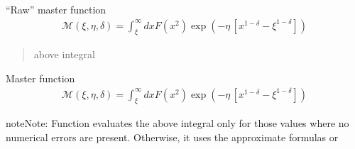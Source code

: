 \documentclass[letterpaper,10pt,english]{sphinxmanual}
\begin{document}
\begin{fulllineitems}
\label{\detokenize{diffsph.spectra:diffsph.spectra.analytics.M_raw}}
\pysigstartsignatures
{}
\pysigstopsignatures
\sphinxAtStartPar
“Raw” master function
\begin{equation*}
\begin{split}\mathcal M(\xi,\eta,\delta) = \int_\xi^\infty dx F(x^2)\exp\left(-\eta\,[x^{1-\delta}-\xi^{1-\delta}]\right)\end{split}
\end{equation*}\begin{quote}\begin{description}
\sphinxAtStartPar
above integral

\end{description}\end{quote}

\end{fulllineitems}


\begin{fulllineitems}
\label{\detokenize{diffsph.spectra:diffsph.spectra.analytics.anltc_Mst}}
\pysigstartsignatures
{}
\pysigstopsignatures
\sphinxAtStartPar
Master function
\begin{equation*}
\begin{split}\mathcal M(\xi,\eta,\delta) = \int_\xi^\infty dx F(x^2)\exp\left(-\eta\,[x^{1-\delta}-\xi^{1-\delta}]\right)\end{split}
\end{equation*}
\begin{sphinxadmonition}{note}{Note:}
\sphinxAtStartPar
Function evaluates the above integral only for those values where no numerical errors are present. Otherwise, it uses the approximate formulas {\hyperref[\detokenize{diffsph.spectra:diffsph.spectra.analytics.M_C}]{}} or {\hyperref[\detokenize{diffsph.spectra:diffsph.spectra.analytics.M_i}]{}}
\end{sphinxadmonition}

\end{fulllineitems}
\end{document}
